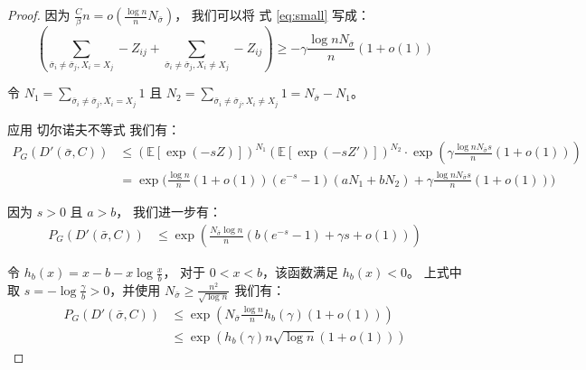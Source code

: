 \begin{proof}
	因为 $\frac{C}{\beta} n = o\left(\frac{\log n}{n} N_{\bar{\sigma}} \right)$，
  我们可以将 式 \eqref{eq:small} 写成：
\begin{equation}
	\left( \sum_{\bar{\sigma}_i  \neq \bar{\sigma}_j, X_i = X_j} -Z_{ij}
	+ \sum_{\bar{\sigma}_i  \neq \bar{\sigma}_j, X_i \neq X_j} -Z_{ij} \right)\geq 
  -\gamma\frac{\log n N_{\bar{\sigma}}}{n}(1+o(1))
\end{equation}
	
	令 $N_1 = \sum_{\bar{\sigma}_i  \neq \bar{\sigma}_j, X_i = X_j} 1$
	且 $N_2 = \sum_{\bar{\sigma}_i  \neq \bar{\sigma}_j, X_i \neq X_j} 1 = N_{\bar{\sigma}} - N_1$。
	
	应用 切尔诺夫不等式 我们有：
	\begin{align*}
	P_G(D'(\bar{\sigma}, C))&
	\leq (\mathbb{E}[\exp(-s Z )])^{N_1} (\mathbb{E}[\exp(-s Z' )])^{N_2} \cdot 
  \exp \left(\gamma \frac{\log n N_{\bar{\sigma}} s}{n}(1+o(1)) \right) \\
	&= \exp \Big( \frac{\log n}{n}(1+o(1))(e^{-s}-1)(aN_1 + bN_2) 
	+\gamma \frac{\log n N_{\bar{\sigma}} s}{n}(1+o(1))\Big)
	\end{align*}
	
	因为 $s > 0$ 且 $a>b$，
  我们进一步有：
	\begin{align*}
	P_G(D'(\bar{\sigma}, C))
	& \leq \exp \left( \frac{N_{\bar{\sigma}}\log n }{n}(b(e^{-s}-1)+ \gamma s + o(1)) \right) 
	\end{align*}
	
	令 $h_b(x) = x - b -x\log \frac{x}{b}$，
  对于 $0<x<b$，该函数满足  $h_b(x) < 0$。
	上式中取 $s=-\log\frac{\gamma}{b} > 0$，并使用
	$N_{\bar{\sigma}} \geq \frac{n^2}{\sqrt{\log n}}$ 我们有：
	\begin{align*}
	P_G(D'(\bar{\sigma}, C))&\leq \exp( N_{\bar{\sigma}} \frac{\log n}{n} h_b(\gamma)(1+o(1))) \\
	& \leq \exp (h_b(\gamma) n \sqrt{\log n} (1+o(1)))
	\end{align*}
\end{proof}

